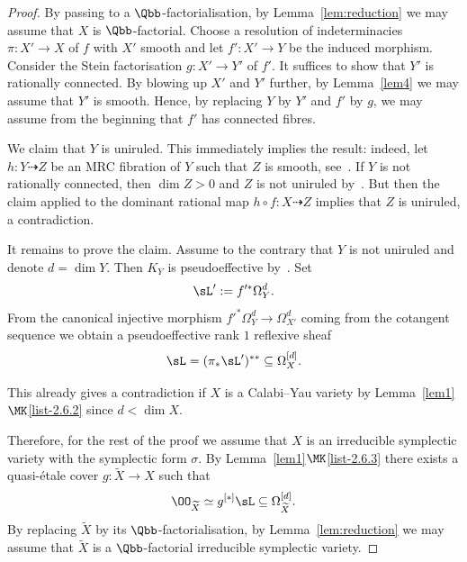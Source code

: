 \begin{proof}
By passing to a $\Qbb$-factorialisation, by Lemma~\ref{lem:reduction} we may assume that $X$ is $\Qbb$-factorial. Choose a resolution of indeterminacies $\pi\colon X' \to X$ of $f$ with $X'$ smooth and let $f'\colon X' \to Y$ be the induced morphism. Consider the Stein factorisation $g\colon X' \to Y'$ of $f'$. It suffices to show that $Y'$ is rationally connected. By blowing up $X'$ and $Y'$ further, by Lemma~\ref{lem4} we may assume that $Y'$ is smooth. Hence, by replacing $Y$ by $Y'$ and $f'$ by $g$, we may assume from the beginning that $f'$ has connected fibres.

We claim that $Y$ is uniruled. This immediately implies the result: indeed, let $h\colon Y \dasharrow Z$ be an MRC fibration of $Y$ such that $Z$ is smooth, see~\cite[Section~IV.5]{Kol96}. If $Y$ is not rationally connected, then $\dim Z > 0$ and $Z$ is not uniruled by~\cite{GHS03}. But then the claim applied to the dominant rational map $h\circ f\colon X\dashrightarrow Z$ implies that $Z$ is uniruled, a contradiction.

It remains to prove the claim. Assume to the contrary that $Y$ is not uniruled and denote $d = \dim Y$. Then $K_Y$ is pseudoeffective by~\cite[Corollary~0.3]{BDPP}. Set
\[
\sL' := f'^*\Omega_Y^d.
\]
From the canonical injective morphism $f'^*\Omega_Y^d\to \Omega^d_{X'}$ coming from the cotangent sequence we obtain a pseudoeffective rank $1$ reflexive sheaf
\[
\sL=(\pi_*\sL')^{**}\subseteq \Omega_X^{[d]}.
\]

This already gives a contradiction if $X$ is a Calabi--Yau variety by Lemma~\ref{lem1}$\MK$\eqref{list-2.6.2} since $d < \dim X$.

Therefore, for the rest of the proof we assume that $X$ is an irreducible symplectic variety with the symplectic form $\sigma$. By Lemma~\ref{lem1}$\MK$\eqref{list-2.6.3} there exists a quasi-étale cover $g\colon\widetilde X \to X$ such that
\begin{equation}\label{eq:sim}
\OO_{\widetilde X} \simeq g^{[*]}\sL\subseteq \Omega^{[d]}_{\widetilde X}.
\end{equation}
By replacing $\widetilde{X}$ by its $\Qbb$-factorialisation, by Lemma~\ref{lem:reduction} we may assume that $\widetilde{X}$ is a $\Qbb$-factorial irreducible symplectic variety.


\end{proof}
